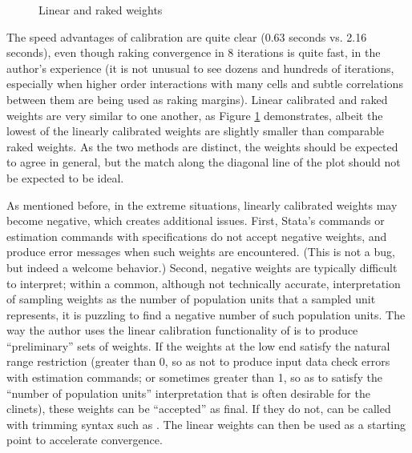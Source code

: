 \bigskip

\begin{stlog}
\nullskip
\end{stlog}

\begin{figure}[hb!]
    \begin{center}
    \end{center}
    \caption{Linear and raked weights}
    \label{fig:linear:raked}
\end{figure}

\clearpage

The speed advantages of  calibration are quite clear (0.63 seconds vs. 2.16 seconds),
even though raking convergence in 8 iterations is quite fast, in the author's experience
(it is not unusual to see dozens and hundreds of iterations, especially when higher order
interactions with many cells and subtle correlations between them are being used as
raking margins).
Linear calibrated and raked weights are very similar to one another, as Figure \ref{fig:linear:raked}
demonstrates, albeit the lowest of the linearly
calibrated weights are slightly smaller than comparable raked weights.
As the two methods are distinct, the weights should be expected to agree in general,
but the match along the diagonal line of the plot should not be expected to be ideal.

As mentioned before, in the extreme situations, linearly calibrated weights
may become negative, which creates additional issues.  First, Stata's 
commands or estimation commands with  specifications do not accept
negative weights, and produce error messages when such weights are encountered.
(This is not a bug, but indeed a welcome behavior.) Second, negative weights are
typically difficult to interpret; within a common, although not technically accurate,
interpretation of sampling weights as the number of population units that a sampled
unit represents, it is puzzling to find a negative number of such population units.
The way the author uses the linear calibration functionality of 
is to produce ``preliminary'' sets of weights. If the weights at the low end
satisfy the natural range restriction (greater than 0, so as not to produce
input data check errors with estimation commands; or sometimes greater than 1,
so as to satisfy the ``number of population units'' interpretation that is often
desirable for the clinets), these weights can be ``accepted'' as final. If they do not,
 can be called with trimming syntax such as .
The linear weights can then be used as a starting point to accelerate convergence.

